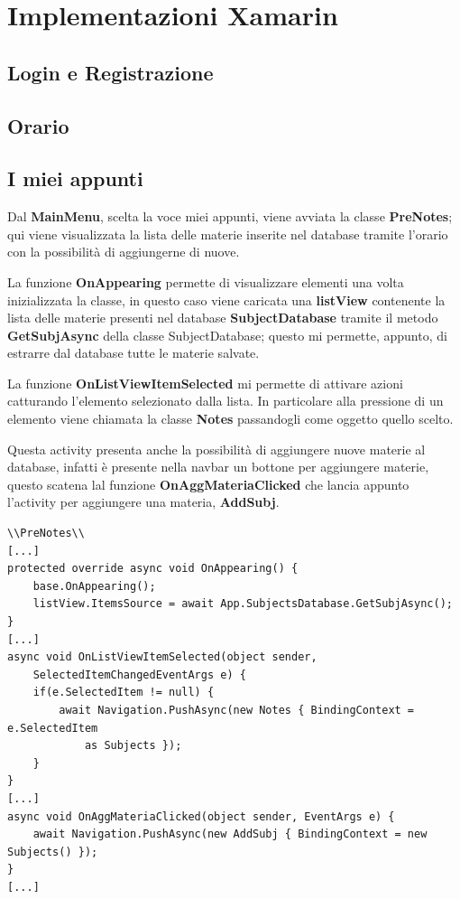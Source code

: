 \documentclass[a4paper, 50pt, twoside]{article}
\begin{document}
\section{Implementazioni Xamarin}
\subsection{Login e Registrazione}
\subsection{Orario}
\subsection{I miei appunti}
Dal \textbf{MainMenu}, scelta la voce miei appunti, viene avviata la classe \textbf{PreNotes}; qui viene visualizzata la lista delle materie inserite nel database tramite l'orario con la possibilità di aggiungerne di nuove.

La funzione \textbf{OnAppearing} permette di visualizzare elementi una volta inizializzata la classe, in questo caso viene caricata una \textbf{listView} contenente la lista delle materie presenti nel database \textbf{SubjectDatabase} tramite il metodo \textbf{GetSubjAsync} della classe SubjectDatabase; questo mi permette, appunto, di estrarre dal database tutte le materie salvate.

La funzione \textbf{OnListViewItemSelected} mi permette di attivare azioni catturando l'elemento selezionato dalla lista. In particolare alla pressione di un elemento viene chiamata la classe \textbf{Notes} passandogli come oggetto quello scelto.

Questa activity presenta anche la possibilità di aggiungere nuove materie al database, infatti è presente nella navbar un bottone per aggiungere materie, questo scatena lal funzione \textbf{OnAggMateriaClicked} che lancia appunto l'activity per aggiungere una materia, \textbf{AddSubj}.
\begin{lstlisting}
\\PreNotes\\
[...]
protected override async void OnAppearing() {
	base.OnAppearing();
	listView.ItemsSource = await App.SubjectsDatabase.GetSubjAsync();
}
[...]
async void OnListViewItemSelected(object sender, 
	SelectedItemChangedEventArgs e) {
	if(e.SelectedItem != null) {
		await Navigation.PushAsync(new Notes { BindingContext = e.SelectedItem 
			as Subjects });
	}
}
[...]
async void OnAggMateriaClicked(object sender, EventArgs e) {
	await Navigation.PushAsync(new AddSubj { BindingContext = new Subjects() });
}
[...]
\end{lstlisting}
\end{document}
